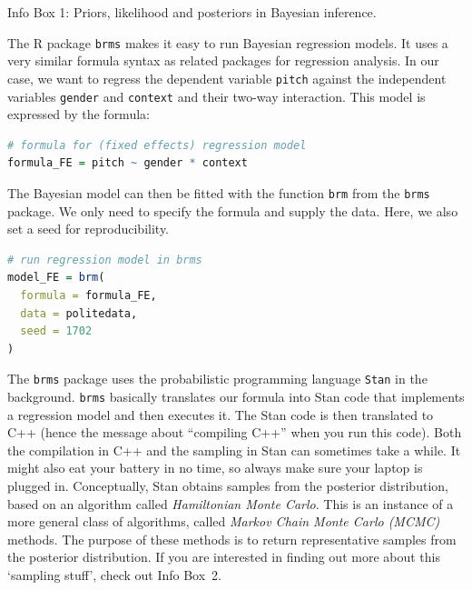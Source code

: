 \documentclass[nobib]{tufte-handout}
\begin{document}
\begin{InfoBox}[]
{\begin{minipage}{1.0\textwidth}
  \end{minipage} \par
  } \par
  \begin{center}
    Info Box 1: Priors, likelihood and posteriors in Bayesian inference.
  \end{center}
\end{InfoBox}


The R package \texttt{brms} \citep{buerkner2016brms} makes it easy to run Bayesian regression models. It uses a very similar formula syntax as related packages for regression analysis. In our case, we want to regress the dependent variable \texttt{pitch} against the independent variables \texttt{gender} and \texttt{context} and their two-way interaction. This model is expressed by the formula:

\begin{minipage}[]{\textwidth}
\begin{lstlisting}[language=R]
# formula for (fixed effects) regression model
formula_FE = pitch ~ gender * context
\end{lstlisting}
\end{minipage}

\vspace{-0.5cm}

The Bayesian model can then be fitted with the function \texttt{brm} from the \texttt{brms} package. We only need to specify the formula and supply the data. Here, we also set a seed for reproducibility.

\begin{minipage}[]{\textwidth}
\begin{lstlisting}[language=R]
# run regression model in brms
model_FE = brm(
  formula = formula_FE, 
  data = politedata, 
  seed = 1702 
)
\end{lstlisting}
\end{minipage}

\vspace{-0.5cm}

\noindent The \texttt{brms} package uses the probabilistic programming language \texttt{Stan}
in the background. \texttt{brms} basically translates our formula into Stan code that
implements a regression model and then executes it. The Stan code is then translated to C++
(hence the message about ``compiling C++'' when you run this code). Both the compilation in C++
and the sampling in Stan can sometimes take a while. It might also eat your battery in no time,
so always make sure your laptop is plugged in. Conceptually, Stan obtains samples from the
posterior distribution, based on an algorithm called \emph{Hamiltonian Monte Carlo}. This is an
instance of a more general class of algorithms, called \emph{Markov Chain Monte Carlo (MCMC)}
methods. The purpose of these methods is to return representative samples from the posterior
distribution. If you are interested in finding out more about this `sampling stuff', check out
Info Box~2.
\end{document}
